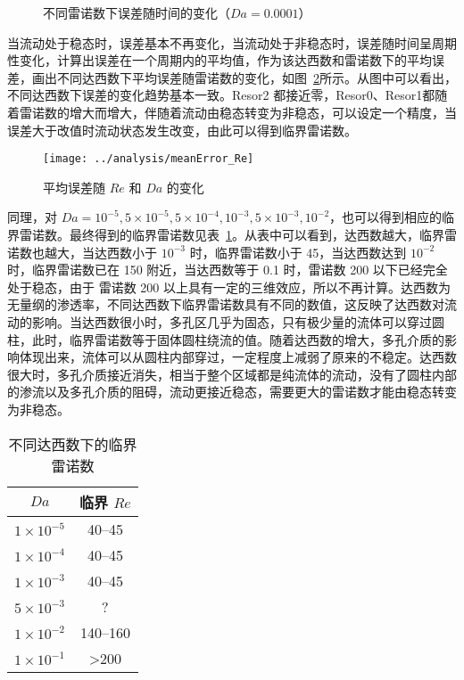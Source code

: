 \begin{figure}
	\centering
	\begin{minipage}{\textwidth}
		\centering
	\end{minipage}
	\centering
	\begin{minipage}{\textwidth}
		\centering
	\end{minipage}
	\caption{不同雷诺数下误差随时间的变化（$Da=0.0001$）}
	\label{fig: resd}
\end{figure}

当流动处于稳态时，误差基本不再变化，当流动处于非稳态时，误差随时间呈周期性变化，计算出误差在一个周期内的平均值，作为该达西数和雷诺数下的平均误差，画出不同达西数下平均误差随雷诺数的变化，如图~\ref{fig: error}所示。从图中可以看出，不同达西数下误差的变化趋势基本一致。Resor2 都接近零，Resor0、Resor1都随着雷诺数的增大而增大，伴随着流动由稳态转变为非稳态，可以设定一个精度，当误差大于改值时流动状态发生改变，由此可以得到临界雷诺数。

\begin{figure}
	\centering
	\texttt{[image: ../analysis/meanError\_Re]}
	\caption{平均误差随 $Re$ 和 $Da$ 的变化}
	\label{fig: error}
\end{figure}

同理，对 $Da=10^{-5},5\times 10^{-5},5\times 10^{-4},10^{-3},5\times 10^{-3},10^{-2}$，也可以得到相应的临界雷诺数。最终得到的临界雷诺数见表~\ref{tab: critical Re}。从表中可以看到，达西数越大，临界雷诺数也越大，当达西数小于 $10^{-3}$ 时，临界雷诺数小于 45，当达西数达到 $10^{-2}$ 时，临界雷诺数已在 150 附近，当达西数等于 0.1 时，雷诺数 200 以下已经完全处于稳态，由于 雷诺数 200 以上具有一定的三维效应，所以不再计算。达西数为无量纲的渗透率，不同达西数下临界雷诺数具有不同的数值，这反映了达西数对流动的影响。当达西数很小时，多孔区几乎为固态，只有极少量的流体可以穿过圆柱，此时，临界雷诺数等于固体圆柱绕流的值。随着达西数的增大，多孔介质的影响体现出来，流体可以从圆柱内部穿过，一定程度上减弱了原来的不稳定。达西数很大时，多孔介质接近消失，相当于整个区域都是纯流体的流动，没有了圆柱内部的渗流以及多孔介质的阻碍，流动更接近稳态，需要更大的雷诺数才能由稳态转变为非稳态。

\begin{table}[h]
	\caption{不同达西数下的临界雷诺数}\label{tab: critical Re}
	\vspace{.5em}\centering\wuhao
	\begin{tabular}{cc}
		\toprule[1.5pt]
		$Da$ & 临界 $Re$ \\
		\midrule[1pt]
		$1\times 10^{-5}$ & 40--45 \\
		$1\times 10^{-4}$ & 40--45 \\
		$1\times 10^{-3}$ & 40--45 \\
		$5\times 10^{-3}$ & ? \\
		$1\times 10^{-2}$ & 140--160 \\
		$1\times 10^{-1}$ & >200 \\
	\bottomrule[1.5pt]
	\end{tabular}
\end{table}

